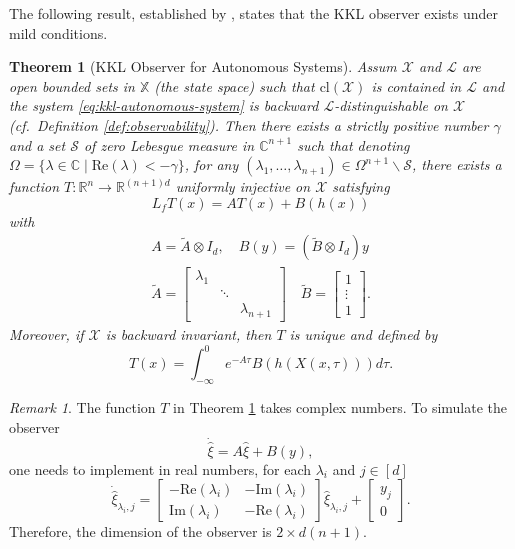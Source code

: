 \documentclass[
]{book}
\newtheorem{theorem}{Theorem}[chapter]
\theoremstyle{definition}
\theoremstyle{definition}
\theoremstyle{definition}
\theoremstyle{definition}
\theoremstyle{remark}
\newtheorem*{remark}{Remark}
\begin{document}
The following result, established by \citep{andrieu06sicopt-kkl}, states that the KKL observer exists under mild conditions.

\begin{theorem}[KKL Observer for Autonomous Systems]
\protect\hypertarget{thm:kklautonomous}{}\label{thm:kklautonomous}Assum \(\mathcal{X}\) and \(\mathcal{L}\) are open bounded sets in \(\mathbb{X}\) (the state space) such that \(\mathrm{cl}(\mathcal{X})\) is contained in \(\mathcal{L}\) and the system \eqref{eq:kkl-autonomous-system} is backward \(\mathcal{L}\)-distinguishable on \(\mathcal{X}\) (cf.~Definition \ref{def:observability}). Then there exists a strictly positive number \(\gamma\) and a set \(\mathcal{S}\) of zero Lebesgue measure in \(\mathbb{C}^{n+1}\) such that denoting \(\Omega = \{ \lambda \in \mathbb{C} \mid \mathrm{Re}(\lambda) < - \gamma \}\), for any \((\lambda_1,\dots,\lambda_{n+1}) \in \Omega^{n+1} \backslash \mathcal{S}\), there exists a function \(T: \mathbb{R}^n \rightarrow \mathbb{R}^{(n+1)d}\) uniformly injective on \(\mathcal{X}\) satisfying
\[
L_f T(x) = A T(x) + B(h(x))
\]
with
\begin{align}
A = \tilde{A} \otimes I_d, \quad B(y) = (\tilde{B} \otimes I_d ) y \\
\tilde{A} = \begin{bmatrix}
\lambda_1 & & \\
& \ddots & \\
& & \lambda_{n+1} \end{bmatrix} 
\quad \tilde{B} = \begin{bmatrix}
1 \\ \vdots \\ 1 \end{bmatrix}.
\end{align}
Moreover, if \(\mathcal{X}\) is backward invariant, then \(T\) is unique and defined by
\begin{equation}
T(x) = \int_{-\infty}^0 e^{-A\tau} B(h(X(x,\tau))) d\tau.
\label{eq:kkl-autonomous-T}
\end{equation}
\end{theorem}

\begin{remark}
The function \(T\) in Theorem \ref{thm:kklautonomous} takes complex numbers. To simulate the observer
\[
\dot{\hat{\xi}} = A \hat{\xi} + B(y),
\]
one needs to implement in real numbers, for each \(\lambda_i\) and \(j \in [d]\)
\[
\dot{\hat{\xi}}_{\lambda_i,j} = 
\begin{bmatrix}
- \mathrm{Re}(\lambda_i) & - \mathrm{Im}(\lambda_i) \\
\mathrm{Im}(\lambda_i) & - \mathrm{Re}(\lambda_i)
\end{bmatrix} \hat{\xi}_{\lambda_i,j} + \begin{bmatrix} y_j \\ 0 \end{bmatrix}.   
\]
Therefore, the dimension of the observer is \(2 \times d (n+1)\).
\end{remark}
\end{document}
